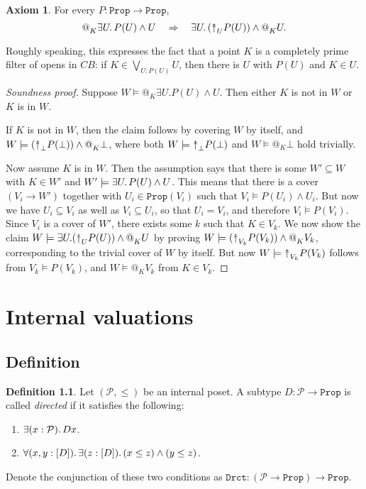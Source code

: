 \documentclass[11pt, oneside, article]{memoir}
\makeatletter
\theoremstyle{plain}
\theoremstyle{definition}
\newtheorem{definition}[theorem]{Definition}
\newtheorem{axiom}{Axiom}
\theoremstyle{remark}
\newenvironment{soundproof}{\begin{proof}[Soundness proof]}{\end{proof}}
\DeclarePairedDelimiter{\subtype}{[}{]}
\newcommand{\const}[1]{\mathtt{#1}}
\newcommand{\Prop}{\const{Prop}}
\newcommand{\BaseSpace}{B}
\newcommand{\AtSymbol}{{@}}
\newcommand{\InSymbol}{{\upclose}}%
\newcommand{\At}[2][]{\AtSymbol^{#1}_{#2}}
\newcommand{\In}[2][]{\InSymbol^{#1}_{#2}}
\newcommand{\upclose}{{\rotatebox[origin=c]{90}{$\twoheadrightarrow$}}}
\newcommand{\imp}{\Rightarrow}
\makeatother
\begin{document}
\begin{axiom}\label{axiom:completely_prime}
For every $P : \Prop \to \Prop$,
\[
	\At{K} \exists U\ldotp P(U) \wedge U \quad \imp \quad \exists U\ldotp (\In{U} P(U)) \wedge \At{K} U.
\]
\end{axiom}

Roughly speaking, this expresses the fact that a point $K$ is a completely prime filter of opens in $C\BaseSpace$: if $K\in \bigvee_{U : P(U)} U$, then there is $U$ with $P(U)$ and $K\in U$.

\begin{soundproof}
    Suppose $W \models @_K \exists U. P(U) \wedge U$. Then either $K$ is not in $W$ or $K$ is in $W$.

    If $K$ is not in $W$, then the claim follows by covering $W$ by itself, and $W \models (\In{\bot} P(\bot)) \wedge \At{K} \bot$, where both $W \models \In{\bot} P(\bot)$ and $W \models \At{K} \bot$ hold trivially.

    Now assume $K$ is in $W$. Then the assumption says that there is some $W'\subseteq W$ with $K\in W'$ and $W' \models \exists U\ldotp P(U) \wedge U$. This means that there is a cover $(V_i\to W')$ together with $U_i\in\Prop(V_i)$ such that $V_i \models P(U_i) \wedge U_i$. But now we have $U_i \subseteq V_i$ as well as $V_i \subseteq U_i$, so that $U_i = V_i$, and therefore $V_i \models P(V_i)$. Since $V_i$ is a cover of $W'$, there exists some $k$ such that $K \in V_k$. We now show the claim $W \models \exists U. (\In{U} P(U)) \wedge \At{K} U$ by proving $W \models (\In{V_k} P(V_k)) \wedge \At{K} V_k$, corresponding to the trivial cover of $W$ by itself. But now $W \models \In{V_k} P(V_k)$ follows from $V_k \models P(V_k)$, and $W \models \At{K} V_k$ from $K\in V_k$.
\end{soundproof}

\chapter{Internal valuations}

\section{Definition}

\begin{definition}
	Let $(\mathcal{P},\leq)$ be an internal poset. A subtype $D:\mathcal{P}\to\Prop$ is called \emph{directed} if it satisfies the following:
\begin{enumerate}
	\item $\exists(x:\mathcal{P})\ldotp Dx$.
	\item $\forall(x,y:\subtype{D})\ldotp\exists(z:\subtype{D})\ldotp(x\leq z)\wedge (y\leq z)$.
\end{enumerate}
Denote the conjunction of these two conditions as $\const{Drct}:(\mathcal{P}\to\Prop)\to\Prop$.
\end{definition}
\end{document}
